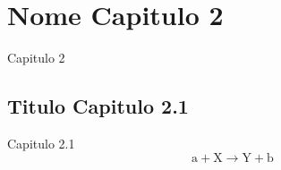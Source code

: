 \chapter{Nome Capitulo 2}
Capitulo 2
\section{ Titulo Capitulo 2.1}
Capitulo 2.1
\begin{equation*}
\mathrm{a + X \rightarrow Y + b}
\end{equation*}